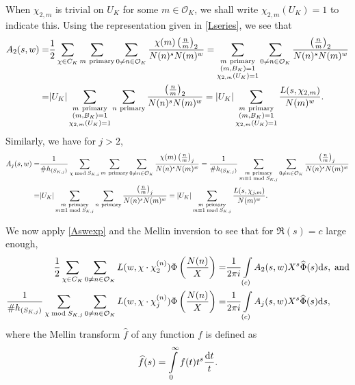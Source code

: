 \documentclass[twoside,leqno,10pt, A4]{amsart}
\begin{document}
  When $\chi_{2, m}$ is trivial on $U_K$ for some $m \in \mathcal O_K$, we shall write $\chi_{2, m}(U_K)=1$ to indicate this.  Using the representation given in \eqref{Lseries}, we see that
\begin{align*}
\begin{split}
A_2(s,w)=& \frac {1}{2}\sum_{\chi \in C_K}\sum_{m\mathrm{\ primary}}\sum_{0 \neq n \in \mathcal O_K}\frac{\chi(m)\left(\frac{n}{m}\right)_2}{N(n)^sN(m)^w} = \sum_{\substack{ m\mathrm{\ primary} \\ (m, B_K)=1 \\ \chi_{2,m}(U_K)=1} }\sum_{0 \neq n \in \mathcal O_K}\frac{\left(\frac{n}{m}\right)_2}{N(n)^sN(m)^w} \\
=& |U_K|\sum_{\substack{ m\mathrm{\ primary} \\ (m,B_K)=1 \\ \chi_{2,m}(U_K)=1} }\sum_{n\mathrm{\ primary}}\frac{\left(\frac{n}{m}\right)_2}{N(n)^sN(m)^w} = |U_K| \sum_{\substack{ m\mathrm{\ primary} \\ (m,B_K)=1 \\ \chi_{2,m}(U_K)=1} } \frac{L(s, \chi_{2,m})}{N(m)^w}.
\end{split}
\end{align*}
  Similarly, we have for $j>2$,
\begin{align}
\label{Aswexp1}
\begin{split}
A_j(s,w)=& \frac {1}{\#h_{(S_{K,j})}}\sum_{\chi \bmod {S_{K,j}}}\sum_{m\mathrm{\ primary}}\sum_{0 \neq n \in \mathcal O_K}\frac{\chi(m)\left(\frac{n}{m}\right)_j}{N(n)^sN(m)^w} = \frac {1}{\#h_{(S_{K,j})}}\sum_{\substack{ m\mathrm{\ primary} \\ m \equiv 1 \bmod {S_{K,j}} } }\sum_{0 \neq n \in \mathcal O_K}\frac{\left(\frac{n}{m}\right)_j}{N(n)^sN(m)^w} \\
=& |U_K|\sum_{\substack{ m\mathrm{\ primary} \\ m \equiv 1 \bmod {S_{K,j}} } }\sum_{n\mathrm{\ primary}}\frac{\left(\frac{n}{m}\right)_j}{N(n)^sN(m)^w} = |U_K| \sum_{\substack{ m\mathrm{\ primary} \\ m \equiv 1 \bmod {S_{K,j}} } } \frac{L(s, \chi_{j,m})}{N(m)^w}.
\end{split}
\end{align}

  We now apply \eqref{Aswexp} and the Mellin inversion to see that for $\Re(s)=c$ large enough,
\begin{align}
\label{MellinInversionj}
\begin{split}
\frac {1}{2}\sum_{\chi \in C_K} \sum_{0 \neq n \in \mathcal O_K} L(w, \chi \cdot \chi^{(n)}_{2})\Phi \left( \frac
{N(n)}X \right)=& \frac1{2\pi i}\int\limits_{(c)}A_2(s,w)X^s\widehat\Phi(s) \mathrm{d} s, \; \mbox{and} \\
\frac {1}{\#h_{(S_{K,j})}}\sum_{\chi \bmod {S_{K,j}}} \sum_{0 \neq n \in \mathcal O_K} L(w, \chi \cdot \chi^{(n)}_{j})\Phi \left( \frac
{N(n)}X \right)=&  \frac1{2\pi i}\int\limits_{(c)}A_j(s,w)X^s\widehat\Phi(s) \mathrm{d} s,
\end{split}
\end{align}
  where the Mellin transform $\widehat{f}$ of any function $f$ is defined as
\begin{align*}
     \widehat{f}(s) =\int\limits^{\infty}_0f(t)t^s\frac {\mathrm{d} t}{t}.
\end{align*}
\end{document}
